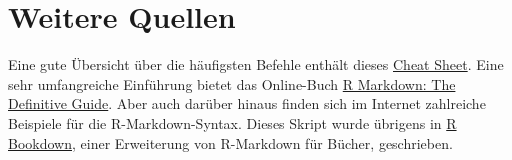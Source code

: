 \documentclass[]{tufte-book}
\begin{document}
\section{Weitere Quellen}\label{weitere-quellen}

Eine gute Übersicht über die häufigsten Befehle enthält dieses
\href{https://rstudio.com/wp-content/uploads/2016/03/rmarkdown-cheatsheet-2.0.pdf}{Cheat
Sheet}. Eine sehr umfangreiche Einführung bietet das Online-Buch
\href{https://bookdown.org/yihui/rmarkdown/}{R Markdown: The Definitive
Guide}. Aber auch darüber hinaus finden sich im Internet zahlreiche
Beispiele für die R-Markdown-Syntax. Dieses Skript wurde übrigens in
\href{https://bookdown.org/yihui/bookdown/}{R Bookdown}, einer
Erweiterung von R-Markdown für Bücher, geschrieben.


\end{document}
